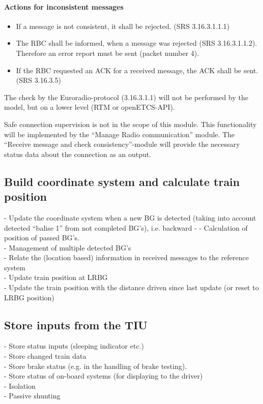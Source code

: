 \documentclass{template/openetcs_report}
\begin{document}
\paragraph{Actions for inconsistent messages}
\begin{itemize}
  \item If a message is not consistent, it shall be rejected. (SRS 3.16.3.1.1.1)
  \item The RBC shall be informed, when a message was rejected (SRS 3.16.3.1.1.2). Therefore an error report must be sent (packet number 4). 
  \item If the RBC requested an ACK for a received message, the ACK shall be sent. (SRS 3.16.3.5)
\end{itemize}

The check by the Euroradio-protocol (3.16.3.1.1) will not be performed by the model, but on a lower level (RTM or openETCS-API).

Safe connection supervision is not in the scope of this module. This functionality will be implemented by the ``Manage Radio communication'' module. The ``Receive message and check consistency''-module will provide the necessary status data about the connection as an output.


\subsection{Build coordinate system and calculate train position}
- Update the coordinate system when a new \gls{BG} is detected (taking into account detected “balise 1” from not completed \gls{BG}'s), i.e. backward -   - Calculation of position of passed \gls{BG}'s.\\
- Management of multiple detected \gls{BG}'s\\
- Relate the (location based) information in received messages to the reference system\\
- Update train position at LR\gls{BG}\\
- Update the train position with the distance driven since last update (or reset to LR\gls{BG} position)\\

\subsection{Store inputs from the TIU}
- Store status inputs (sleeping indicator etc.)\\
- Store changed train data\\
- Store brake status (e.g. in the handling of brake testing).\\
- Store status of on-board systems (for displaying to the driver)\\
- Isolation\\
- Passive shunting\\
\end{document}

